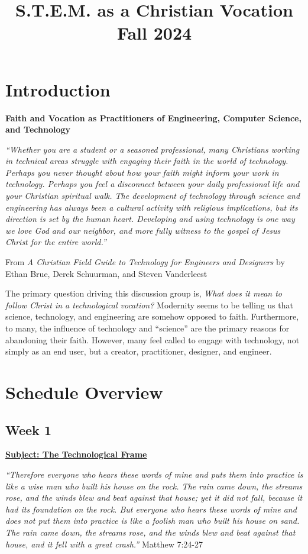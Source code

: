\documentclass[11pt]{article}
\date{}
\title{S.T.E.M. as a Christian Vocation\\\medskip
\large Fall 2024}
\let\oldsection\section
\renewcommand\section{\clearpage\oldsection}
\begin{document}
\maketitle
\section*{Introduction}
\label{sec:org4a1bde5}
\begin{center}
\textbf{Faith and Vocation as Practitioners of Engineering, Computer Science, and
 Technology}
\end{center}

\emph{``Whether you are a student or a seasoned professional, many Christians working
in technical areas struggle with engaging their faith in the world of
technology. Perhaps you never thought about how your faith might inform your
work in technology. Perhaps you feel a disconnect between your daily
professional life and your Christian spiritual walk. The development of
technology through science and engineering has always been a cultural activity
with religious implications, but its direction is set by the human heart.
Developing and using technology is one way we love God and our neighbor, and
more fully witness to the gospel of Jesus Christ for the entire world.''}

\begin{flushright}
From \emph{A Christian Field Guide to Technology for Engineers and Designers} by
Ethan Brue, Derek Schuurman, and Steven Vanderleest
\end{flushright}

The primary question driving this discussion group is, \emph{What does it mean to
follow Christ in a technological vocation?} Modernity seems to be telling us that
science, technology, and engineering are somehow opposed to faith. Furthermore,
to many, the influence of technology and ``science'' are the primary reasons for
abandoning their faith. However, many feel called to engage with technology, not
simply as an end user, but a creator, practitioner, designer, and engineer.
\section*{Schedule Overview}
\label{sec:org6ea12ce}
\subsection*{Week 1}
\label{sec:org98323b9}
\textbf{\uline{Subject: The Technological Frame}}
\begin{mdframed}[nobreak=true]
\emph{“Therefore everyone who hears these words of mine and puts them into practice
is like a wise man who built his house on the rock. The rain came down, the
streams rose, and the winds blew and beat against that house; yet it did not
fall, because it had its foundation on the rock. But everyone who hears these
words of mine and does not put them into practice is like a foolish man who
built his house on sand. The rain came down, the streams rose, and the winds
blew and beat against that house, and it fell with a great crash.”} Matthew
7:24-27
\end{mdframed}
\end{document}
